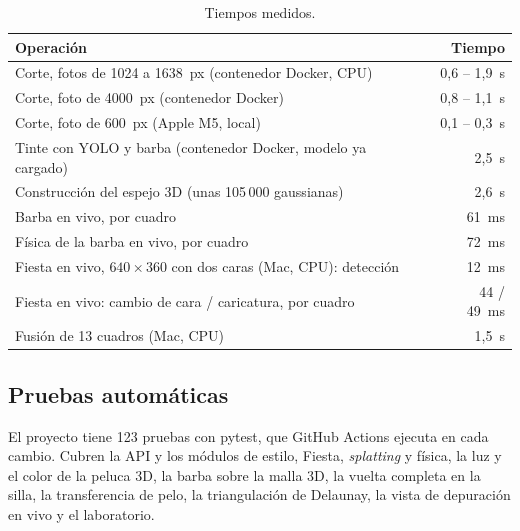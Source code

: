 \begin{table}[ht]
\centering
\small
\begin{tabularx}{\linewidth}{@{}X r@{}}
\toprule
Operación & Tiempo \\
\midrule
Corte, fotos de 1024 a 1638~px (contenedor Docker, CPU) & 0{,}6 -- 1{,}9~s \\
Corte, foto de 4000~px (contenedor Docker) & 0{,}8 -- 1{,}1~s \\
Corte, foto de 600~px (Apple M5, local) & 0{,}1 -- 0{,}3~s \\
Tinte con YOLO y barba (contenedor Docker, modelo ya cargado) & 2{,}5~s \\
Construcción del espejo 3D (unas 105\,000 gaussianas) & 2{,}6~s \\
Barba en vivo, por cuadro & 61~ms \\
Física de la barba en vivo, por cuadro & 72~ms \\
Fiesta en vivo, $640\times360$ con dos caras (Mac, CPU): detección & 12~ms \\
Fiesta en vivo: cambio de cara / caricatura, por cuadro & 44 / 49~ms \\
Fusión de 13 cuadros (Mac, CPU) & 1{,}5~s \\
\bottomrule
\end{tabularx}
\caption{Tiempos medidos.}
\label{tab:tiempos}
\end{table}

\subsection{Pruebas automáticas}
\label{sec:pruebas}

El proyecto tiene 123 pruebas con pytest, que GitHub Actions ejecuta en cada cambio. Cubren la API y los módulos de estilo, Fiesta, \emph{splatting} y física, la luz y el color de la peluca 3D, la barba sobre la malla 3D, la vuelta completa en la silla, la transferencia de pelo, la triangulación de Delaunay, la vista de depuración en vivo y el laboratorio.

